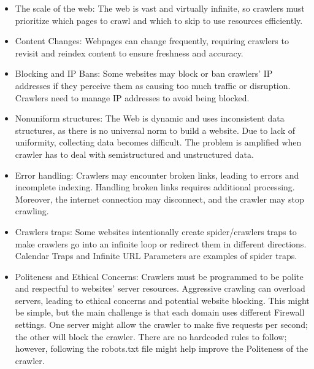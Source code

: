 \begin{itemize}
\item The scale of the web: The web is vast and virtually infinite, so crawlers must prioritize which pages to crawl and which to skip to use resources efficiently.

\item Content Changes: Webpages can change frequently, requiring crawlers to revisit and reindex content to ensure freshness and accuracy.

\item Blocking and IP Bans: Some websites may block or ban crawlers' IP addresses if they perceive them as causing too much traffic or disruption. Crawlers need to manage IP addresses to avoid being blocked.

\item Nonuniform structures: The Web is dynamic
and uses inconsistent data structures, as there is
no universal norm to build a website. Due to lack of uniformity, collecting data becomes difficult. The problem is amplified when crawler has to deal with semistructured and unstructured data.

\item Error handling: Crawlers may encounter broken links, leading to errors and incomplete indexing. Handling broken links requires additional processing. Moreover, the internet connection may disconnect, and the crawler may stop crawling. 

\item Crawlers traps: Some websites intentionally create spider/crawlers traps to make crawlers go into an infinite loop or redirect them in different directions. Calendar Traps and Infinite URL Parameters are examples of spider traps.

\item Politeness and Ethical Concerns: Crawlers must be programmed to be polite and respectful to websites' server resources. Aggressive crawling can overload servers, leading to ethical concerns and potential website blocking. This might be simple, but the main challenge is that each domain uses different Firewall settings. One server might allow the crawler to make five requests per second; the other will block the crawler. There are no hardcoded rules to follow; however, following the robots.txt file might help improve the  Politeness of the crawler.
\end{itemize}


\\


